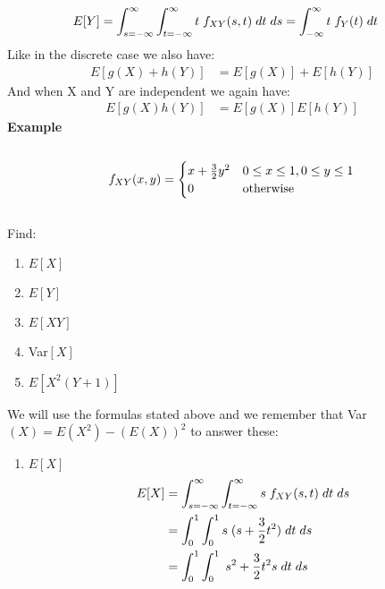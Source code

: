 \documentclass[,oneside]{article}
\begin{document}
\begin{enumerate}
\begin{align*}
E[Y]&=\int_{s=-\infty}^{\infty} \int_{t=-\infty}^{\infty}t\hspace{0.1cm}f_{XY}(s,t)\hspace{0.1cm}dt\hspace{0.1cm}ds=\int_{-\infty}^{\infty} t \hspace{0.1cm}f_Y(t)\hspace{0.1cm}dt
\end{align*}
Like in the discrete case we also have:\\
\begin{align*}
E[g(X)+h(Y)]&=E[g(X)]+E[h(Y)]
\end{align*}
And when X and Y are independent we again have:\\
\begin{align*}
E[g(X)h(Y)]&=E[g(X)]E[h(Y)]
\end{align*}
\textbf{Example}\\ \\
\[
f_{XY}(x,y)=
\begin{cases}
x+\frac{3}{2}y^2 &  0 \leq x \leq 1, 0 \leq y \leq 1\\
0 & $otherwise$
\end{cases} \] \\
Find:
\begin{enumerate}
\item $E[X]$
\item $E[Y]$
\item $E[XY]$
\item Var$[X]$
\item $E[X^2(Y+1)]$
\end{enumerate}
We will use the formulas stated above and we remember that Var$(X)=E(X^2)-(E(X))^2$ to answer these:\\
\begin{enumerate}
\item $E[X]$
\begin{align*}
E[X]&=\int_{s=-\infty}^{\infty} \int_{t=-\infty}^{\infty}s\hspace{0.1cm}f_{XY}(s,t)\hspace{0.1cm}dt\hspace{0.1cm}ds\\
&=\int_{0}^{1} \int_{0}^{1}s\hspace{0.1cm} (s+\frac{3}{2}t^2)\hspace{0.1cm}dt\hspace{0.1cm}ds\\
&=\int_{0}^{1} \int_{0}^{1}\hspace{0.1cm} s^2+\frac{3}{2}t^2 s\hspace{0.1cm}dt\hspace{0.1cm}ds\\

\end{align*}
\end{enumerate}
\end{enumerate}
\end{document}

